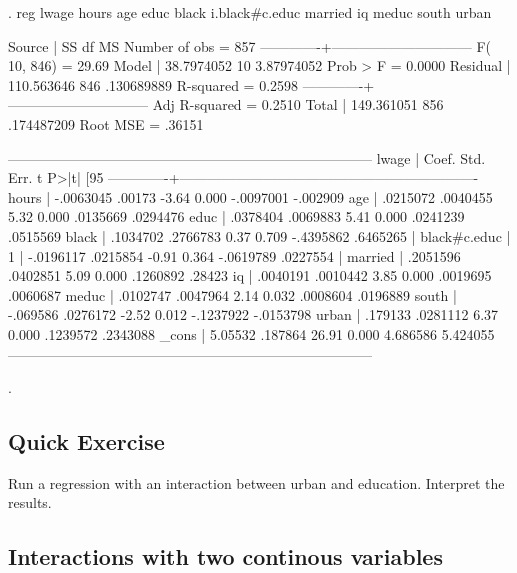 \documentclass[12pt]{article}
\begin{document}
\begin{stlog}
     
. reg lwage hours age educ black i.black#c.educ married  iq meduc south urban

      Source |       SS       df       MS              Number of obs =     857
-------------+------------------------------           F( 10,   846) =   29.69
       Model |  38.7974052    10  3.87974052           Prob > F      =  0.0000
    Residual |  110.563646   846  .130689889           R-squared     =  0.2598
-------------+------------------------------           Adj R-squared =  0.2510
       Total |  149.361051   856  .174487209           Root MSE      =  .36151

------------------------------------------------------------------------------
       lwage |      Coef.   Std. Err.      t    P>|t|     [95%
-------------+----------------------------------------------------------------
       hours |  -.0063045     .00173    -3.64   0.000    -.0097001    -.002909
         age |   .0215072   .0040455     5.32   0.000     .0135669    .0294476
        educ |   .0378404   .0069883     5.41   0.000     .0241239    .0515569
       black |   .1034702   .2766783     0.37   0.709    -.4395862    .6465265
             |
black#c.educ |
          1  |  -.0196117   .0215854    -0.91   0.364    -.0619789    .0227554
             |
     married |   .2051596   .0402851     5.09   0.000     .1260892      .28423
          iq |   .0040191   .0010442     3.85   0.000     .0019695    .0060687
       meduc |   .0102747   .0047964     2.14   0.032     .0008604    .0196889
       south |   -.069586   .0276172    -2.52   0.012    -.1237922   -.0153798
       urban |    .179133   .0281112     6.37   0.000     .1239572    .2343088
       _cons |    5.05532    .187864    26.91   0.000     4.686586    5.424055
------------------------------------------------------------------------------

. 
\end{stlog}


\subsection{Quick Exercise}

Run a regression with an interaction between urban and
education. Interpret the results. 

\subsection{Interactions with two continous variables}
\label{sec:inter-with-two-1}
\end{document}
